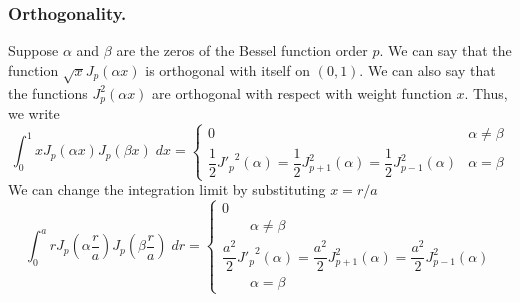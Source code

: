 \documentclass[../../../main.tex]{subfiles}
\begin{document}
\subsubsection{Orthogonality.} Suppose $\alpha$ and $\beta$ are the zeros of the Bessel function order $p$.
We can say that the function $\sqrt{x}J_p(\alpha x)$ is orthogonal with itself on $(0,1)$.
We can also say that the functions $J_p^2(\alpha x)$ are orthogonal with respect with weight function $x$.
Thus, we write
\begin{equation*}
    \int_{0}^{1}xJ_p(\alpha x)J_p(\beta x)\;dx=\begin{cases}
        0                                                                                         & \alpha\neq \beta \\
        \dfrac{1}{2}{J'_p}^2(\alpha)=\dfrac{1}{2}J_{p+1}^2(\alpha) =\dfrac{1}{2}J_{p-1}^2(\alpha) & \alpha=\beta
    \end{cases}
\end{equation*}
We can change the integration limit by substituting $x=r/a$
\begin{equation*}
    \int_{0}^{a}rJ_p\left(\alpha \frac{r}{a}\right)J_p\left(\beta \frac{r}{a}\right)\;dr=\begin{cases}
        0                                                                                               \\
        \qquad \alpha\neq \beta                                                                         \\
        \dfrac{a^2}{2}{J'_p}^2(\alpha)=\dfrac{a^2}{2}J_{p+1}^2(\alpha) =\dfrac{a^2}{2}J_{p-1}^2(\alpha) \\
        \qquad\alpha=\beta
    \end{cases}
\end{equation*}
\end{document}
